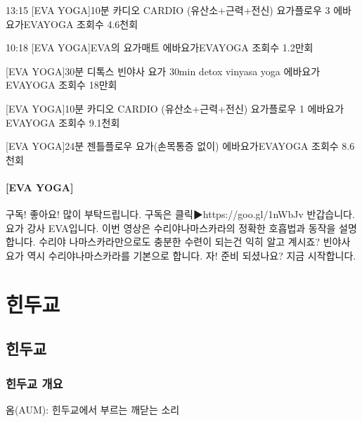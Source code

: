 \documentclass[12pt, a4paper, oneside]{book}
\let\stdsection\section
\renewcommand\section{\newpage\stdsection}
\begin{document}
13:15
[EVA YOGA]10분 카디오 CARDIO (유산소+근력+전신) 요가플로우 3
에바요가EVAYOGA
조회수 4.6천회


10:18
[EVA YOGA]EVA의 요가매트
에바요가EVAYOGA
조회수 1.2만회

[EVA YOGA]30분 디톡스 빈야사 요가 30min detox vinyasa yoga
에바요가EVAYOGA
조회수 18만회

[EVA YOGA]10분 카디오 CARDIO (유산소+근력+전신) 요가플로우 1
에바요가EVAYOGA
조회수 9.1천회

[EVA YOGA]24분 젠틀플로우 요가(손목통증 없이)
에바요가EVAYOGA
조회수 8.6천회


\subsection{[EVA YOGA]}



구독! 좋아요! 많이 부탁드립니다. 구독은 클릭▶https://goo.gl/1nWbJv
반갑습니다. 요가 강사 EVA입니다. 이번 영상은 수리야나마스카라의 정확한 호흡법과 동작을 설명합니다. 수리야 나마스카라만으로도 충분한 수련이 되는건 익히 알고 계시죠? 빈야사 요가 역시 수리야나마스카라를 기본으로 합니다.
자! 준비 되셨나요?  지금 시작합니다.









	\part{힌두교}
	\noptcrule
	\parttoc				



	\chapter{힌두교}
	\minitoc				



%
	\section{힌두교 개요}


옴(AUM): 힌두교에서 부르는 깨닫는 소리 \\
\end{document}
